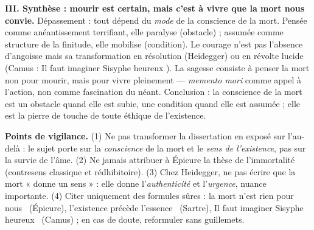\documentclass[11pt]{article}
\begin{document}
\begin{corrige}
\textbf{III. Synthèse : mourir est certain, mais c'est à vivre que la mort nous convie.} Dépassement : tout dépend du \emph{mode} de la conscience de la mort. Pensée comme anéantissement terrifiant, elle paralyse (obstacle) ; assumée comme structure de la finitude, elle mobilise (condition). Le courage n'est pas l'absence d'angoisse mais sa transformation en résolution (Heidegger) ou en révolte lucide (Camus : \guillemotleft Il faut imaginer Sisyphe heureux \guillemotright). La sagesse consiste à penser la mort non pour mourir, mais pour vivre pleinement — \emph{memento mori} comme appel à l'action, non comme fascination du néant. Conclusion : la conscience de la mort est un obstacle quand elle est subie, une condition quand elle est assumée ; elle est la pierre de touche de toute éthique de l'existence.

\textbf{Points de vigilance.} (1) Ne pas transformer la dissertation en exposé sur l'au-delà : le sujet porte sur la \emph{conscience} de la mort et le \emph{sens de l'existence}, pas sur la survie de l'âme. (2) Ne jamais attribuer à Épicure la thèse de l'immortalité (contresens classique et rédhibitoire). (3) Chez Heidegger, ne pas écrire que la mort « donne un sens » : elle donne l'\emph{authenticité} et l'\emph{urgence}, nuance importante. (4) Citer uniquement des formules sûres : \guillemotleft la mort n'est rien pour nous \guillemotright\ (Épicure), \guillemotleft l'existence précède l'essence \guillemotright\ (Sartre), \guillemotleft Il faut imaginer Sisyphe heureux \guillemotright\ (Camus) ; en cas de doute, reformuler sans guillemets.
\end{corrige}
\end{document}
